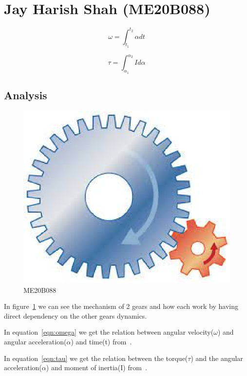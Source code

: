 \section{Jay Harish Shah (ME20B088)}
\begin{equation}
\omega =\int_{t_1}^{t_2}{ \alpha dt}	
\label{eqn:omega}
\end{equation}

\begin{equation}
\tau = \int_{\alpha_1}^{\alpha_2}{I d\alpha}
\label{eqn:tau}
\end{equation}

\subsection{Analysis}
\begin{figure}
	\begin{center}
		\includegraphics[scale=0.5]{me20b088/me20b088.eps}
	\end{center}
	\caption{ME20B088}
	\label{fig1}
\end{figure}

In figure~\ref{fig1} we can see the mechanism of 2 gears and how each work 
by having direct dependency on the other gears dynamics.

In equation~\ref{eqn:omega} we get the relation between
angular velocity($ \omega $) and angular acceleration($ \alpha $) and time(t)
from~\cite{wu}.

In equation~\ref{eqn:tau} we get the relation between the torque($ \tau $)
and the angular acceleration($ \alpha $) 
and moment of inertia(I) from~\cite{lazarian}.
 
%
%
